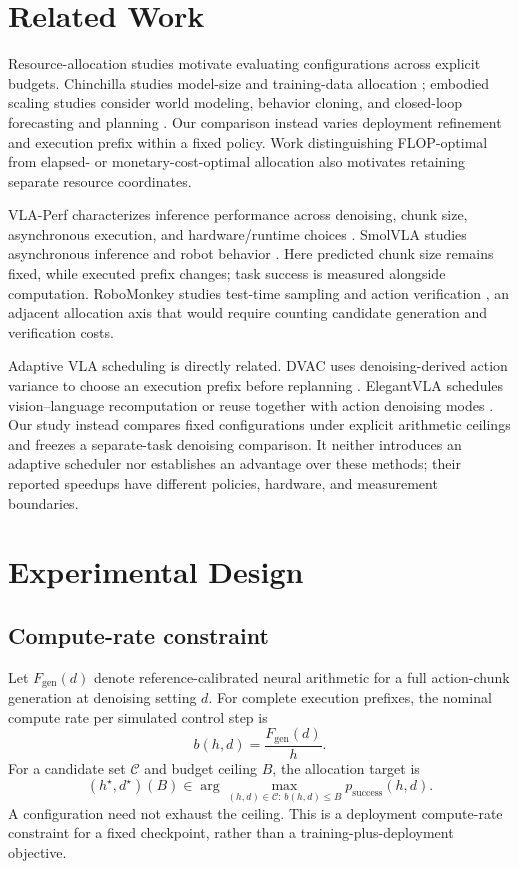 \documentclass{article}
\begin{document}
\section{Related Work}

Resource-allocation studies motivate evaluating configurations across explicit
budgets. Chinchilla studies model-size and training-data allocation
\cite{chinchilla}; embodied scaling studies consider world modeling, behavior
cloning, and closed-loop forecasting and planning
\cite{pearcescaling,motionscaling}. Our comparison instead varies deployment
refinement and execution prefix within a fixed policy. Work distinguishing
FLOP-optimal from elapsed- or monetary-cost-optimal allocation
\cite{beyondchinchilla} also motivates retaining separate resource coordinates.

VLA-Perf characterizes inference performance across denoising, chunk size,
asynchronous execution, and hardware/runtime choices \cite{vlaperf}.
SmolVLA studies asynchronous inference and robot behavior \cite{smolvla}.
Here predicted chunk size remains fixed, while executed prefix changes; task
success is measured alongside computation. RoboMonkey studies test-time sampling
and action verification \cite{robomonkey}, an adjacent allocation axis that
would require counting candidate generation and verification costs.

Adaptive VLA scheduling is directly related. DVAC uses denoising-derived action
variance to choose an execution prefix before replanning \cite{dvac}.
ElegantVLA schedules vision--language recomputation or reuse together with action
denoising modes \cite{elegantvla}. Our study instead compares fixed configurations
under explicit arithmetic ceilings and freezes a separate-task denoising
comparison. It neither introduces an adaptive scheduler nor establishes an
advantage over these methods; their reported speedups have different policies,
hardware, and measurement boundaries.

\section{Experimental Design}
\label{sec:method}

\subsection{Compute-rate constraint}

Let $F_{\mathrm{gen}}(d)$ denote reference-calibrated neural arithmetic for a full
action-chunk generation at denoising setting $d$. For complete execution prefixes, the nominal
compute rate per simulated control step is
\[
 b(h,d)=\frac{F_{\mathrm{gen}}(d)}{h}.
\]
For a candidate set $\mathcal C$ and budget ceiling $B$, the allocation target is
\begin{equation}
 (h^\star,d^\star)(B)\in
 \arg\max_{(h,d)\in\mathcal C:\,b(h,d)\le B}
 p_{\mathrm{success}}(h,d).
 \label{eq:allocation}
\end{equation}
A configuration need not exhaust the ceiling. This is a deployment compute-rate
constraint for a fixed checkpoint, rather than a training-plus-deployment
objective.
\end{document}
